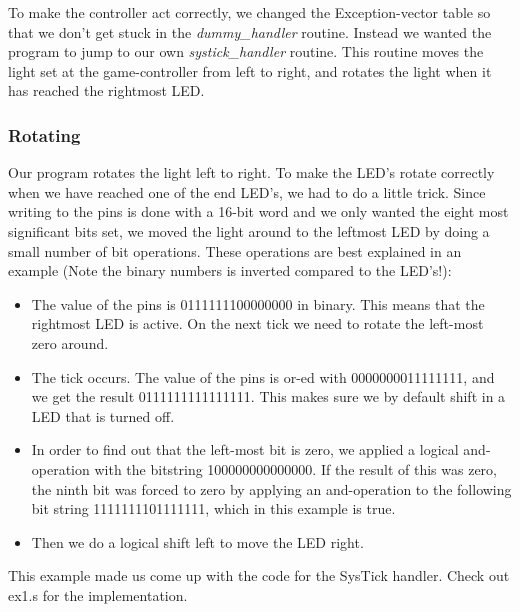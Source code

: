 To make the controller act correctly, we changed the Exception-vector table so that we don't get stuck in the \emph{dummy\_handler} routine. Instead we wanted the program to jump to our own \emph{systick\_handler} routine. This routine moves the light set at the game-controller from left to right, and rotates the light when it has reached the rightmost LED.

	\subsubsection{Rotating}
	Our program rotates the light left to right. To make the LED's rotate correctly when we have reached one of the end LED's, we had to do a little trick. Since writing to the pins is done with a 16-bit word and we only wanted the eight most significant bits set, we moved the light around to the leftmost LED by doing a small number of bit operations. These operations are best explained in an example (Note the binary numbers is inverted compared to the LED's!):
	\begin{itemize}
	\item The value of the pins is 0111111100000000 in binary. This means that the rightmost LED is active. On the next tick we need to rotate the left-most zero around.
	\item The tick occurs. The value of the pins is or-ed with 0000000011111111, and we get the result 0111111111111111. This makes sure we by default shift in a LED that is turned off.
	\item  In order to find out that the left-most bit is zero, we applied a logical and-operation with the bitstring 100000000000000. If the result of this was zero, the ninth bit was forced to zero by applying an and-operation to the following bit string 1111111101111111, which in this example is true.
	\item Then we do a logical shift left to move the LED right.
	\end{itemize}

This example made us come up with the code for the SysTick handler. Check out ex1.s for the implementation.